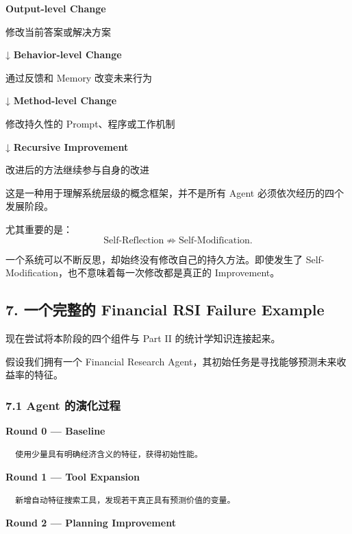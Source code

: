 \textbf{Output-level Change}

修改当前答案或解决方案

↓ \textbf{Behavior-level Change}

通过反馈和 Memory 改变未来行为

↓ \textbf{Method-level Change}

修改持久性的 Prompt、程序或工作机制

↓ \textbf{Recursive Improvement}

改进后的方法继续参与自身的改进

这是一种用于理解系统层级的概念框架，并不是所有 Agent 必须依次经历的四个发展阶段。

尤其重要的是：
\[\text{Self-Reflection}
\not\Rightarrow
\text{Self-Modification}.\]

一个系统可以不断反思，却始终没有修改自己的持久方法。即使发生了 Self-Modification，也不意味着每一次修改都是真正的 Improvement。

\hypertarget{part-3-34-0001-ux4e00ux4e2aux5b8cux6574ux7684-financial-rsi-failure-example}{%
\subsection{7. 一个完整的 Financial RSI Failure Example}\label{part-3-34-0001-ux4e00ux4e2aux5b8cux6574ux7684-financial-rsi-failure-example}}

现在尝试将本阶段的四个组件与 Part II 的统计学知识连接起来。

假设我们拥有一个 Financial Research Agent，其初始任务是寻找能够预测未来收益率的特征。

\hypertarget{part-3-34-0001-agent-ux7684ux6f14ux5316ux8fc7ux7a0b}{%
\subsubsection{7.1 Agent 的演化过程}\label{part-3-34-0001-agent-ux7684ux6f14ux5316ux8fc7ux7a0b}}

\textbf{Round 0 --- Baseline}

\begin{verbatim}
  使用少量具有明确经济含义的特征，获得初始性能。
\end{verbatim}

\textbf{Round 1 --- Tool Expansion}

\begin{verbatim}
  新增自动特征搜索工具，发现若干真正具有预测价值的变量。
\end{verbatim}

\textbf{Round 2 --- Planning Improvement}

